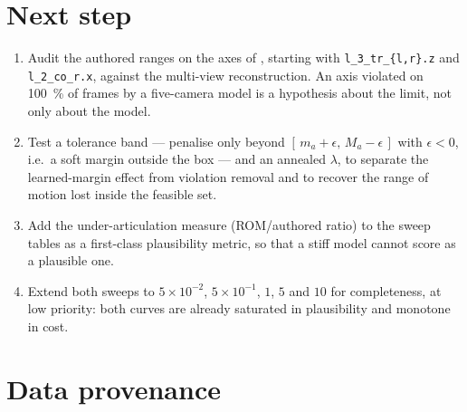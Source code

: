 \documentclass[11pt,a4paper]{article}
\newcommand{\lam}{\lambda}
\begin{document}
\section{Next step}
\label{sec:next}

\begin{enumerate}[leftmargin=1.9em,itemsep=0.45em]

\item Audit the authored ranges on the axes of , starting with
      \texttt{l\_3\_tr\_\{l,r\}.z} and \texttt{l\_2\_co\_r.x}, against the
      multi-view reconstruction. An axis violated on \SI{100}{\percent} of
      frames by a five-camera model is a hypothesis about the limit, not only
      about the model.
\item Test a tolerance band --- penalise only beyond $[\,m_a + \epsilon,\,
      M_a - \epsilon\,]$ with $\epsilon < 0$, i.e.\ a soft margin outside the
      box --- and an annealed $\lam$, to separate the learned-margin effect
      from violation removal and to recover the range of motion lost inside the
      feasible set.
\item Add the under-articulation measure (ROM/authored ratio) to the sweep
      tables as a first-class plausibility metric, so that a stiff model cannot
      score as a plausible one.
\item Extend both sweeps to $5{\times}10^{-2}$, $5{\times}10^{-1}$, $1$, $5$
      and $10$ for completeness, at low priority: both curves are already
      saturated in plausibility and monotone in cost.
\end{enumerate}

\appendix
\sloppy
\section{Data provenance}
\label{app:prov}
\end{document}
